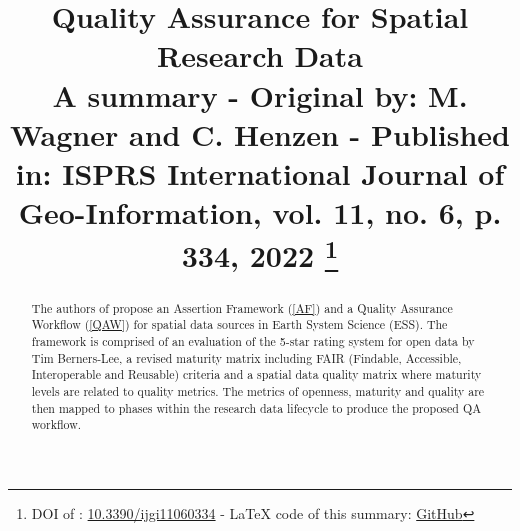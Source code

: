 \documentclass[conference]{IEEEtran}
\begin{document}
\title{Quality Assurance for Spatial Research Data\\
{\footnotesize A summary - Original by: M. Wagner and C. Henzen - Published in: ISPRS International Journal of Geo-Information, vol. 11, no. 6, p. 334, 2022 \cite{sjr}}
\thanks{DOI of \cite{wagner2022quality}: \href{https://doi.org/10.3390/ijgi11060334}{10.3390/ijgi11060334} - LaTeX code of this summary: \href{https://github.com/Anything-Code/quality-assurance-for-spatial-research-data-a-summary/blob/master/summary.tex}{GitHub}}
}

\author{
\and
{}
\and
{}
}

\maketitle

\begin{abstract}
    The authors of \cite{wagner2022quality} propose an Assertion Framework (\ref{AF}) and a Quality Assurance Workflow (\ref{QAW}) for spatial data sources in Earth System Science (ESS). The framework is comprised of an evaluation of the 5-star rating system for open data by Tim Berners-Lee, a revised maturity matrix including FAIR (Findable, Accessible, Interoperable and Reusable) criteria and a spatial data quality matrix where maturity levels are related to quality metrics. The metrics of openness, maturity and quality are then mapped to phases within the research data lifecycle to produce the proposed QA workflow.
\end{abstract}
\end{document}

